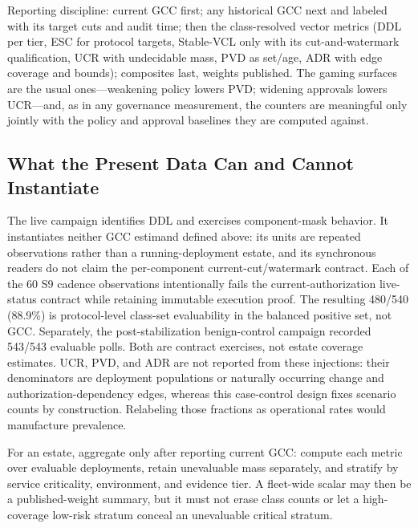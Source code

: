 Reporting discipline: current GCC first; any historical GCC next and labeled
with its target cuts and audit time; then the class-resolved vector metrics
(DDL per tier, ESC for protocol targets, Stable-VCL only with its
cut-and-watermark qualification, UCR with
undecidable mass, PVD as set/age, ADR with edge coverage and bounds);
composites last, weights published. The gaming surfaces are the usual
ones---weakening policy lowers PVD; widening approvals lowers UCR---and, as in
any governance measurement, the counters are meaningful only jointly with
the policy and approval baselines they are computed against.

\subsection{What the Present Data Can and Cannot Instantiate}
The live campaign identifies DDL and exercises component-mask behavior. It
instantiates neither GCC estimand defined above: its units are repeated
observations rather than a running-deployment estate, and its synchronous
readers do not claim the per-component current-cut/watermark contract. Each of
the 60 S9 cadence observations intentionally fails the current-authorization
live-status contract while retaining immutable execution proof. The resulting
480/540 (88.9\%) is protocol-level class-set evaluability in the balanced
positive set, not GCC. Separately, the post-stabilization benign-control
campaign recorded 543/543 evaluable polls. Both are contract exercises, not
estate coverage estimates.
UCR, PVD, and ADR are not
reported from these injections: their denominators are deployment populations
or naturally occurring change and authorization-dependency edges, whereas
this case-control design fixes scenario counts by construction. Relabeling
those fractions as operational rates would manufacture prevalence.

For an estate, aggregate only after reporting current GCC: compute each metric
over evaluable deployments, retain unevaluable mass separately, and stratify
by service criticality, environment, and evidence tier. A fleet-wide scalar
may then be a published-weight summary, but it must not erase class counts or
let a high-coverage low-risk stratum conceal an unevaluable critical stratum.
